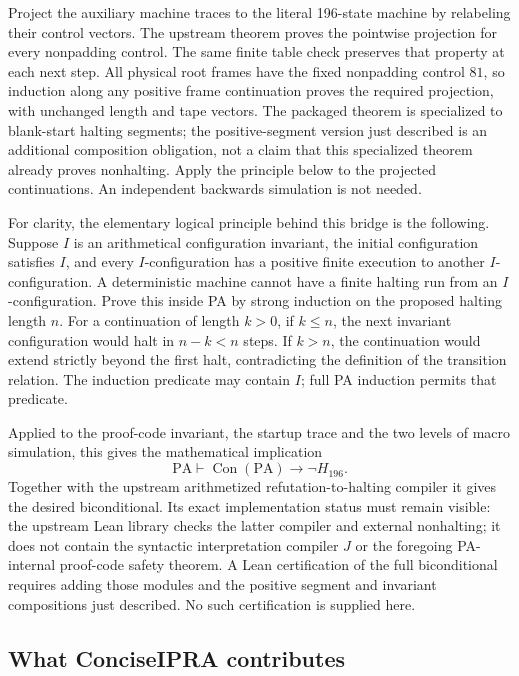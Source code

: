 Project the auxiliary machine traces to the literal 196-state machine by
relabeling their control vectors. The upstream theorem
 proves the pointwise projection for every
nonpadding control. The same finite table check preserves that property
at each next step. All physical root frames have the fixed nonpadding
control $81$, so induction along any positive frame continuation proves
the required projection, with unchanged length and tape vectors. The
packaged theorem  is
specialized to blank-start halting segments; the positive-segment version
just described is an additional composition obligation, not a claim that
this specialized theorem already proves nonhalting. Apply the principle
below to the projected continuations. An independent backwards simulation
is not needed.

For clarity, the elementary logical principle behind this bridge is the
following. Suppose $I$ is an arithmetical configuration invariant, the
initial configuration satisfies $I$, and every $I$-configuration has a
positive finite execution to another $I$-configuration. A deterministic
machine cannot have a finite halting run from an $I$-configuration. Prove
this inside PA by strong induction on the proposed halting length $n$.
For a continuation of length $k>0$, if $k\le n$, the next invariant
configuration would halt in $n-k<n$ steps. If $k>n$, the continuation would
extend strictly beyond the first halt, contradicting the definition of
the transition relation. The induction predicate may contain $I$;
full PA induction permits that predicate.

Applied to the proof-code invariant, the startup trace and the two levels
of macro simulation, this gives the mathematical implication
\[
 \mathrm{PA}\vdash \operatorname{Con}(\mathrm{PA})\longrightarrow\neg H_{196}.
\]
Together with the upstream arithmetized refutation-to-halting compiler it
gives the desired biconditional. Its exact implementation status must remain
visible: the upstream Lean library checks the latter compiler and external
nonhalting; it does not contain the syntactic interpretation compiler $J$
or the foregoing PA-internal proof-code safety theorem. A Lean certification
of the full biconditional requires adding those modules and the positive
segment and invariant compositions just described. No such certification
is supplied here.

\subsection{What ConciseIPRA contributes}

